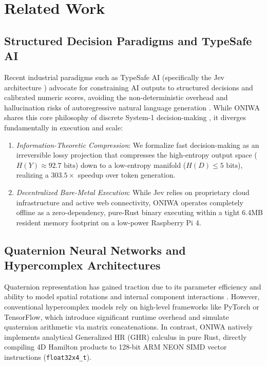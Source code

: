 \documentclass[10pt,twocolumn,letterpaper]{article}
\begin{document}
\section{Related Work}

\subsection{Structured Decision Paradigms and TypeSafe AI}
Recent industrial paradigms such as TypeSafe AI (specifically the Jev architecture \cite{typesafe2025}) advocate for constraining AI outputs to structured decisions and calibrated numeric scores, avoiding the non-deterministic overhead and hallucination risks of autoregressive natural language generation \cite{radford2019language}. While ONIWA shares this core philosophy of discrete System-1 decision-making \cite{kahneman2011}, it diverges fundamentally in execution and scale:
\begin{enumerate}
    \item \textit{Information-Theoretic Compression}: We formalize fast decision-making as an irreversible lossy projection that compresses the high-entropy output space ($H(Y) \approx 92.7\text{ bits}$) down to a low-entropy manifold ($H(D) \le 5\text{ bits}$), realizing a $303.5\times$ speedup over token generation.
    \item \textit{Decentralized Bare-Metal Execution}: While Jev relies on proprietary cloud infrastructure and active web connectivity, ONIWA operates completely offline as a zero-dependency, pure-Rust binary executing within a tight 6.4MB resident memory footprint on a low-power Raspberry Pi 4.
\end{enumerate}

\subsection{Quaternion Neural Networks and Hypercomplex Architectures}
Quaternion representation has gained traction due to its parameter efficiency and ability to model spatial rotations and internal component interactions \cite{parcollet2019, tay2019hypercomplex, zhang2021phm}. However, conventional hypercomplex models rely on high-level frameworks like PyTorch or TensorFlow, which introduce significant runtime overhead and simulate quaternion arithmetic via matrix concatenations. In contrast, ONIWA natively implements analytical Generalized HR (GHR) calculus in pure Rust, directly compiling 4D Hamilton products \cite{hamilton1843} to 128-bit ARM NEON SIMD vector instructions (\texttt{float32x4\_t}).
\end{document}
